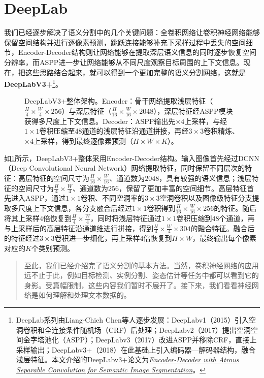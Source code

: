 \section{DeepLab}

我们已经逐步解决了语义分割中的几个关键问题：全卷积网络让卷积神经网络能够保留空间结构并进行逐像素预测，跳跃连接能够补充下采样过程中丢失的空间细节，Encoder-Decoder结构则让网络能够在提取深层语义信息的同时逐步恢复空间分辨率，而ASPP进一步让网络能够从不同尺度观察目标周围的上下文信息。现在，把这些思路结合起来，就可以得到一个更加完整的语义分割网络，这就是\textbf{DeepLabV3+}\footnote{DeepLab系列由Liang-Chieh Chen等人逐步发展：DeepLabv1（2015）引入空洞卷积和全连接条件随机场（CRF）后处理；DeepLabv2（2017）提出空洞空间金字塔池化（ASPP）；DeepLabv3（2017）改进ASPP并移除CRF，直接上采样输出；DeepLabv3+（2018）在此基础上引入编码器—解码器结构，融合浅层特征。本文介绍的DeepLabv3+论文为\href{https://arxiv.org/abs/1802.02611}{\textit{Encoder-Decoder with Atrous Separable Convolution for Semantic Image Segmentation}}。}。

\begin{figure}[H]
    \caption{DeepLabV3+整体架构。Encoder：骨干网络提取浅层特征（$\tfrac{H}{4}\times\tfrac{W}{4}\times 256$）与深层特征（$\tfrac{H}{16}\times\tfrac{W}{16}\times 2048$），深层特征经ASPP模块获得多尺度上下文信息。Decoder：ASPP输出先$\times 4$上采样，与经$1\times 1$卷积压缩至48通道的浅层特征沿通道拼接，再经$3\times 3$卷积精炼、$\times 4$上采样，得到最终逐像素预测（$H\times W\times K$）。}
    \label{fig:deeplab}
\end{figure}

如\cref{fig:deeplab}所示，DeepLabV3+整体采用Encoder-Decoder结构。输入图像首先经过DCNN（Deep Convolutional Neural Network）网络提取特征，同时保留不同层次的特征：高层特征的空间尺寸为$\frac{H}{16}\times\frac{W}{16}$、通道数为$2048$，具有较强的语义信息；浅层特征的空间尺寸为$\frac{H}{4}\times\frac{W}{4}$、通道数为$256$，保留了更加丰富的空间细节。高层特征首先进入ASPP，通过$1\times1$卷积、不同空洞率的$3\times3$空洞卷积以及图像级特征分支提取多尺度上下文信息，各分支融合后经过$1\times1$卷积得到$\frac{H}{16}\times\frac{W}{16}\times256$的特征。随后将其上采样$4$倍恢复到$\frac{H}{4}\times\frac{W}{4}$，同时将浅层特征通过$1\times1$卷积压缩到$48$个通道，再与上采样后的高层特征沿通道维进行拼接，得到$\frac{H}{4}\times\frac{W}{4}\times304$的融合特征。融合后的特征经过$3\times3$卷积进一步细化，再上采样$4$倍恢复到$H\times W$，最终输出每个像素对应的$K$个类别预测。

\begin{quote}
    至此，我们已经介绍完了语义分割的基本方法。当然，卷积神经网络的应用远不止于此，例如目标检测、实例分割、姿态估计等任务中都可以看到它的身影。受篇幅限制，这些内容我们暂时不展开了。接下来，我们看看神经网络是如何理解和处理文本数据的。
\end{quote}
